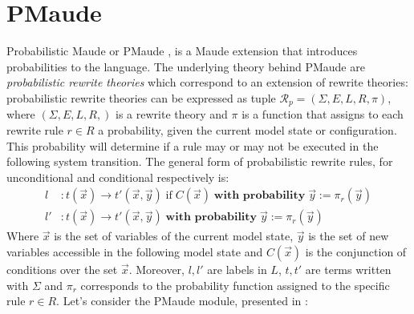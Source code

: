 \section{PMaude}
Probabilistic Maude or PMaude \cite{Agha2006}, is a Maude extension that introduces probabilities to the language. The underlying theory behind PMaude are  \textit{probabilistic rewrite theories} which correspond to an extension of rewrite theories: probabilistic rewrite theories can be expressed as tuple $\mathscr{R}_p = (\Sigma, E, L, R, \pi)$, where $(\Sigma, E, L, R,)$ is a rewrite theory and $\pi$ is a function that assigns to each rewrite rule $r \in R$ a probability, given the current model state or configuration. This probability will determine if a rule may or may not be executed in the following system transition. The general form of probabilistic rewrite rules, for unconditional and conditional respectively is:
\begin{align*}
    l &: t(\overrightarrow{x}) \rightarrow t'(\overrightarrow{x}, \overrightarrow{y}) \; \text{if} \; C(\overrightarrow{x}) \; \textbf{with probability} \; \overrightarrow{y} := \pi_r(\overrightarrow{y}) \\
    l' &: t(\overrightarrow{x}) \rightarrow t'(\overrightarrow{x}, \overrightarrow{y}) \; \textbf{with probability} \; \overrightarrow{y} := \pi_r(\overrightarrow{y})  
\end{align*}
Where $\overrightarrow{x}$ is the set of variables of the current model state,  $\overrightarrow{y}$ is the set of new variables accessible in the following model state and $C(\overrightarrow{x})$ is the conjunction of conditions over the set $\overrightarrow{x}$. Moreover, $l, l'$ are labels in $L$, $t,t'$ are terms written with $\Sigma$ and $\pi_r$ corresponds to the probability function assigned to the specific rule $r \in R$. 
Let's consider the PMaude module, presented in \cite{Agha2006}: \\
